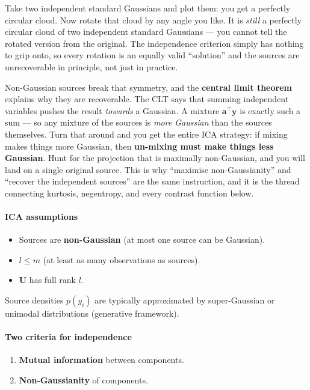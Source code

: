 \documentclass[11pt, oneside]{book}
\newcommand{\T}{^{\top}}
\begin{document}
\begin{intbox}[title={Why Gaussians kill ICA --- and why the CLT is the key}]
Take two independent standard Gaussians and plot them: you get a perfectly
circular cloud.
Now rotate that cloud by any angle you like.
It is \emph{still} a perfectly circular cloud of two independent standard
Gaussians --- you cannot tell the rotated version from the original.
The independence criterion simply has nothing to grip onto, so every rotation is
an equally valid ``solution'' and the sources are unrecoverable in principle, not
just in practice.

Non-Gaussian sources break that symmetry, and the \textbf{central limit theorem}
explains why they are recoverable.
The CLT says that summing independent variables pushes the result \emph{towards}
a Gaussian.
A mixture $\bm{a}\T\bm{y}$ is exactly such a sum --- so any mixture of the sources
is \emph{more Gaussian} than the sources themselves.
Turn that around and you get the entire ICA strategy: if mixing makes things more
Gaussian, then \textbf{un-mixing must make things less Gaussian}.
Hunt for the projection that is maximally non-Gaussian, and you will land on a
single original source.
This is why ``maximise non-Gaussianity'' and ``recover the independent sources''
are the same instruction, and it is the thread connecting kurtosis, negentropy,
and every contrast function below.
\end{intbox}

\paragraph{ICA assumptions}
\begin{itemize}
  \item Sources are \textbf{non-Gaussian} (at most one source can be Gaussian).
  \item $l \leq m$ (at least as many observations as sources).
  \item $\bm{U}$ has full rank $l$.
\end{itemize}
Source densities $p(y_i)$ are typically approximated by super-Gaussian or unimodal
distributions (generative framework).

\paragraph{Two criteria for independence}
\begin{enumerate}
  \item \textbf{Mutual information} between components.
  \item \textbf{Non-Gaussianity} of components.
\end{enumerate}
\end{document}
